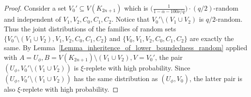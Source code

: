 \begin{proof}
Consider a set $V_0'\subseteq V(K_{2n+1})$ which is $\big(\frac{1}{1-\alpha-100\nu/q}\big)\cdot (q/2)$-random and independent of $V_1, V_2, C_0, C_1, C_2$. Notice that $V_0'\setminus (V_1\cup V_2)$ is $q/2$-random. Thus the joint distributions of the families of random sets $\{V_0'\setminus (V_1\cup V_2),  V_1, V_2, C_0, C_1, C_2\}$ and $\{V_0,  V_1, V_2, C_0, C_1, C_2\}$ are exactly the same. By Lemma~\ref{Lemma_inheritence_of_lower_boundedness_random} applied with $A=U_{\phi}, B=V(K_{2n+1})\setminus (V_1\cup V_2), V=V_0'$, the pair $(U_{\phi}, V_0'\setminus (V_1\cup V_2))$ is $\xi$-replete with high probability. Since $(U_{\phi}, V_0'\setminus (V_1\cup V_2))$ has the same distribution as $(U_{\phi}, V_0)$, the latter pair is also  $\xi$-replete with high probability.
\end{proof}


